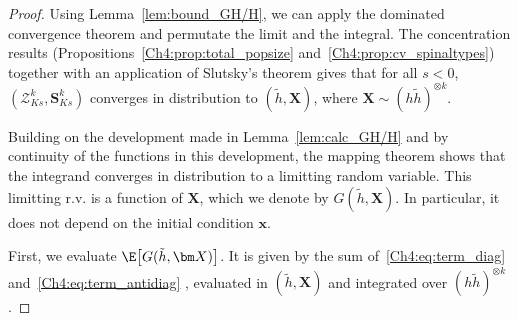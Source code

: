 \begin{refsegment}
\begin{proof}
  Using Lemma~\ref{lem:bound_GH/H}, we can apply the dominated convergence theorem and permutate the limit and the integral.
  The concentration results (Propositions~\ref{Ch4:prop:total_popsize} and~\ref{Ch4:prop:cv_spinaltypes}) together with an application of Slutsky's theorem gives that for all $s<0$, $(\mathcal Z^k_{Ks},\bm S^k_{Ks})$ converges in distribution to $(\tilde h, \bm X)$, where $\bm X \sim (h\tilde h)^{\otimes k}$.

    Building on the development made in Lemma~\ref{lem:calc_GH/H} and by continuity of the functions in this development, the mapping theorem shows that the integrand converges in distribution to a limitting random variable. This limitting r.v. is a function of $\bm X$, which we denote by $G(\tilde h,\bm X)$. In particular, it does not depend on the initial condition $\bm x$.

First, we evaluate $\E\big[G(\tilde h, \bm X)\big]$. It is given by the sum of~\eqref{Ch4:eq:term_diag} and~\eqref{Ch4:eq:term_antidiag} , evaluated in $(\tilde h, \bm X)$ and integrated over $(h\tilde h)^{\otimes k}$. 


\end{proof}
\end{refsegment}
